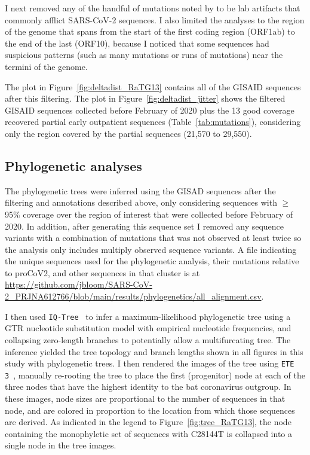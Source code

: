 \documentclass[9pt,twocolumn,twoside]{gsajnl_modified}
\begin{document}
{I next removed any of the handful of mutations noted by \citet{turakhia2020stability} to be lab artifacts that commonly afflict SARS-CoV-2 sequences.
I also limited the analyses to the region of the genome that spans from the start of the first coding region (ORF1ab) to the end of the last (ORF10), because I noticed that some sequences had suspicious patterns (such as many mutations or runs of mutations) near the termini of the genome.

The plot in Figure~\ref{fig:deltadist_RaTG13} contains all of the GISAID sequences after this filtering.
The plot in Figure~\ref{fig:deltadist_jitter} shows the filtered GISAID sequences collected before February of 2020 plus the 13 good coverage recovered partial early outpatient sequences (Table~\ref{tab:mutations}), considering only the region covered by the partial sequences (21,570 to 29,550).

\subsection{Phylogenetic analyses}
The phylogenetic trees were inferred using the GISAD sequences after the filtering and annotations described above, only considering sequences with $\ge$95\% coverage over the region of interest that were collected before February of 2020.
In addition, after generating this sequence set I removed any sequence variants with a combination of mutations that was not observed at least twice so the analysis only includes multiply observed sequence variants.
A file indicating the unique sequences used for the phylogenetic analysis, their mutations relative to proCoV2, and other sequences in that cluster is at \url{https://github.com/jbloom/SARS-CoV-2_PRJNA612766/blob/main/results/phylogenetics/all_alignment.csv}.

I then used \texttt{IQ-Tree}~\citep{minh2020iq} to infer a maximum-likelihood phylogenetic tree using a GTR nucleotide substitution model with empirical nucleotide frequencies, and collapsing zero-length branches to potentially allow a multifurcating tree.
The inference yielded the tree topology and branch lengths shown in all figures in this study with phylogenetic trees.
I then rendered the images of the tree using \texttt{ETE 3}~\citep{huerta2016ete}, manually re-rooting the tree to place the first (progenitor) node at each of the three nodes that have the highest identity to the bat coronavirus outgroup.
In these images, node sizes are proportional to the number of sequences in that node, and are colored in proportion to the location from which those sequences are derived.
As indicated in the legend to Figure~\ref{fig:tree_RaTG13}, the node containing the monophyletic set of sequences with C28144T is collapsed into a single node in the tree images.

}
\end{document}
